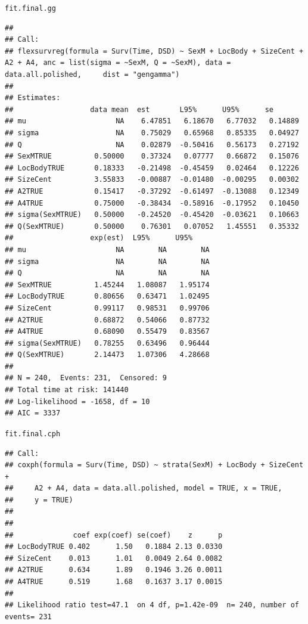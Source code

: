 \documentclass{article}\usepackage[]{graphicx}\usepackage[]{color}
\makeatletter
\newcommand{\hlstd}[1]{\textcolor[rgb]{0.345,0.345,0.345}{#1}}%
\newenvironment{kframe}{%
 \def\at@end@of@kframe{}%
 \ifinner\ifhmode%
  \def\at@end@of@kframe{\end{minipage}}%
  \begin{minipage}{\columnwidth}%
 \fi\fi%
 \def\FrameCommand##1{\hskip\@totalleftmargin \hskip-\fboxsep
 \colorbox{shadecolor}{##1}\hskip-\fboxsep
     \hskip-\linewidth \hskip-\@totalleftmargin \hskip\columnwidth}%
 \MakeFramed {\advance\hsize-\width
   \@totalleftmargin\z@ \linewidth\hsize
   \@setminipage}}%
 {\par\unskip\endMakeFramed%
 \at@end@of@kframe}
\newenvironment{knitrout}{}{} %
\makeatother
\begin{document}
\begin{knitrout}
\begin{kframe}
\begin{alltt}
\hlstd{fit.final.gg}
\end{alltt}
\begin{verbatim}
## 
## Call:
## flexsurvreg(formula = Surv(Time, DSD) ~ SexM + LocBody + SizeCent +     A2 + A4, anc = list(sigma = ~SexM, Q = ~SexM), data = data.all.polished,     dist = "gengamma")
## 
## Estimates: 
##                  data mean  est       L95%      U95%      se      
## mu                     NA    6.47851   6.18670   6.77032   0.14889
## sigma                  NA    0.75029   0.65968   0.85335   0.04927
## Q                      NA    0.02879  -0.50416   0.56173   0.27192
## SexMTRUE          0.50000    0.37324   0.07777   0.66872   0.15076
## LocBodyTRUE       0.18333   -0.21498  -0.45459   0.02464   0.12226
## SizeCent          3.55833   -0.00887  -0.01480  -0.00295   0.00302
## A2TRUE            0.15417   -0.37292  -0.61497  -0.13088   0.12349
## A4TRUE            0.75000   -0.38434  -0.58916  -0.17952   0.10450
## sigma(SexMTRUE)   0.50000   -0.24520  -0.45420  -0.03621   0.10663
## Q(SexMTRUE)       0.50000    0.76301   0.07052   1.45551   0.35332
##                  exp(est)  L95%      U95%    
## mu                     NA        NA        NA
## sigma                  NA        NA        NA
## Q                      NA        NA        NA
## SexMTRUE          1.45244   1.08087   1.95174
## LocBodyTRUE       0.80656   0.63471   1.02495
## SizeCent          0.99117   0.98531   0.99706
## A2TRUE            0.68872   0.54066   0.87732
## A4TRUE            0.68090   0.55479   0.83567
## sigma(SexMTRUE)   0.78255   0.63496   0.96444
## Q(SexMTRUE)       2.14473   1.07306   4.28668
## 
## N = 240,  Events: 231,  Censored: 9
## Total time at risk: 141440
## Log-likelihood = -1658, df = 10
## AIC = 3337
\end{verbatim}
\begin{alltt}
\hlstd{fit.final.cph}
\end{alltt}
\begin{verbatim}
## Call:
## coxph(formula = Surv(Time, DSD) ~ strata(SexM) + LocBody + SizeCent + 
##     A2 + A4, data = data.all.polished, model = TRUE, x = TRUE, 
##     y = TRUE)
## 
## 
##              coef exp(coef) se(coef)    z      p
## LocBodyTRUE 0.402      1.50   0.1884 2.13 0.0330
## SizeCent    0.013      1.01   0.0049 2.64 0.0082
## A2TRUE      0.634      1.89   0.1946 3.26 0.0011
## A4TRUE      0.519      1.68   0.1637 3.17 0.0015
## 
## Likelihood ratio test=47.1  on 4 df, p=1.42e-09  n= 240, number of events= 231
\end{verbatim}
\end{kframe}
\end{knitrout}
\end{document}
